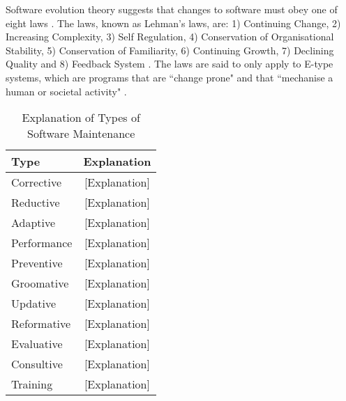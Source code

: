 \documentclass{sig-alternate}
\begin{document}
Software evolution theory suggests that changes to software must obey one of eight laws \cite{lehman1980programs}. The laws, known as Lehman's laws, are: 1) Continuing Change, 2) Increasing Complexity, 3) Self Regulation, 4) Conservation of Organisational Stability, 5) Conservation of Familiarity, 6) Continuing Growth, 7) Declining Quality and 8) Feedback System \cite{lehman1980programs}. The laws are said to only apply to E-type systems, which are programs that are ``change prone" and that ``mechanise a human or societal activity" \cite{lehman1980programs}.     

\begin{table}
       \centering
       \begin{tabular}[ht]{l|c}
              \toprule

              \textbf{Type}                              & \textbf{Explanation}    \\ \midrule
              Corrective    & [Explanation]                      \\ \hline
              Reductive     & [Explanation]                     \\ \hline
              Adaptive      & [Explanation]                      \\ \hline
              Performance   & [Explanation]                     \\ \hline
              Preventive    & [Explanation]                      \\ \hline
              Groomative    & [Explanation]                      \\ \hline
              Updative      & [Explanation]                     \\ \hline
              Reformative   & [Explanation]                     \\ \hline
              Evaluative    & [Explanation]                     \\ \hline
              Consultive    & [Explanation]                     \\ \hline
              Training      & [Explanation]                     \\ 

              \bottomrule

       \end{tabular}
       \caption{Explanation of Types of Software Maintenance}
       \label{table:expl_types}
\end{table}
\end{document}

